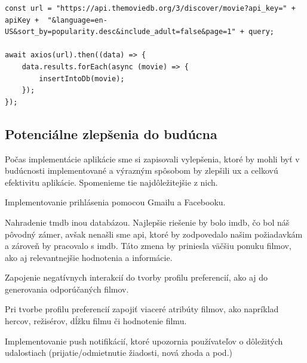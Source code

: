 \begin{lstlisting}[caption={Get request na TMDb}, label={appjs-navDone}] 
const url = "https://api.themoviedb.org/3/discover/movie?api_key=" + apiKey +  "&language=en-US&sort_by=popularity.desc&include_adult=false&page=1" + query;

await axios(url).then((data) => {
    data.results.forEach(async (movie) => {
        insertIntoDb(movie);
    });
});

\end{lstlisting}
\subsection{Potenciálne zlepšenia do budúcna}
Počas implementácie aplikácie sme si zapisovali vylepšenia, ktoré by mohli byť v budúcnosti implementované a výrazným spôsobom by zlepšili \acrshort{ux} a celkovú efektivitu aplikácie. Spomenieme tie najdôležitejšie z nich.
\begin{itemize}
{\item Implementovanie prihlásenia pomocou Gmailu a Facebooku.}
{\item Nahradenie \acrshort{tmdb} inou databázou. Najlepšie riešenie by bolo \acrshort{imdb}, čo bol náš pôvodný zámer, avšak nenašli sme \acrshort{api}, ktoré by zodpovedalo našim požiadavkám a zároveň by pracovalo s \acrshort{imdb}. Táto zmena by priniesla väčšiu ponuku filmov, ako aj relevantnejšie hodnotenia a informácie.}
{\item Zapojenie negatívnych interakcií do tvorby profilu preferencií, ako aj do generovania odporúčaných filmov.}
{\item Pri tvorbe profilu preferencií zapojiť viaceré atribúty filmov, ako napríklad hercov, režisérov, dĺžku filmu či hodnotenie filmu.}
{\item Implementovanie push notifikácií, ktoré upozornia používateľov o dôležitých udalostiach (prijatie/odmietnutie žiadosti, nová zhoda a pod.)}
\end{itemize}









